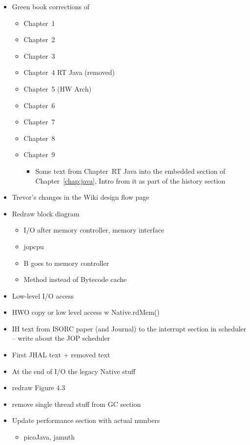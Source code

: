 \begin{itemize}
  \item Green book corrections of
  \begin{itemize}
    \item Chapter~1
    \item Chapter~2
    \item Chapter~3
    \item Chapter~4 RT Java (removed)
    \item Chapter~5 (HW Arch)
    \item Chapter~6
    \item Chapter~7
    \item Chapter~8
    \item Chapter~9
    \begin{itemize}
      \item Some text from Chapter~RT Java into the
          embedded section of Chapter~\ref{chap:java},
          Intro from it as part of the history section
    \end{itemize}
  \end{itemize}
    \item Trevor's changes in the Wiki design flow page
    \item Redraw block diagram
    \begin{itemize}
      \item I/O after memory controller, memory interface
      \item jopcpu
      \item B goes to memory controller
      \item Method instead of Bytecode cache
    \end{itemize}
    \item Low-level I/O access
    \item HWO copy or low level access w Native.rdMem()
    \item IH text from ISORC paper (and Journal) to the
        interrupt section in scheduler -- write about the JOP
        scheduler
    \item First JHAL text + removed text
    \item At the end of I/O the legacy Native stuff
    \item redraw Figure 4.3
    \item remove single thread stuff from GC section
    \item Update performance section with actual numbers
    \begin{itemize}
        \item picoJava, jamuth
    \end{itemize}
\end{itemize}


